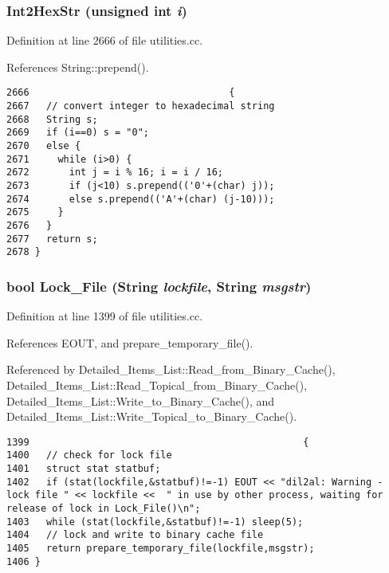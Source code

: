 \subsubsection{ Int2Hex\-Str (unsigned int {\em i})}\label{utilities_8cc_a80}




Definition at line 2666 of file utilities.cc.

References String::prepend().



\footnotesize\begin{verbatim}2666                                   {
2667   // convert integer to hexadecimal string
2668   String s;
2669   if (i==0) s = "0";
2670   else {
2671     while (i>0) {
2672       int j = i % 16; i = i / 16;
2673       if (j<10) s.prepend(('0'+(char) j));
2674       else s.prepend(('A'+(char) (j-10)));
2675     }
2676   }
2677   return s;
2678 }
\end{verbatim}\normalsize 
{}
\subsubsection{\setlength{\rightskip}{0pt plus 5cm}bool Lock\_\-File ({\bf String} {\em lockfile}, {\bf String} {\em msgstr})}\label{utilities_8cc_a12}




Definition at line 1399 of file utilities.cc.

References EOUT, and prepare\_\-temporary\_\-file().

Referenced by Detailed\_\-Items\_\-List::Read\_\-from\_\-Binary\_\-Cache(), Detailed\_\-Items\_\-List::Read\_\-Topical\_\-from\_\-Binary\_\-Cache(), Detailed\_\-Items\_\-List::Write\_\-to\_\-Binary\_\-Cache(), and Detailed\_\-Items\_\-List::Write\_\-Topical\_\-to\_\-Binary\_\-Cache().



\footnotesize\begin{verbatim}1399                                                {
1400   // check for lock file
1401   struct stat statbuf;
1402   if (stat(lockfile,&statbuf)!=-1) EOUT << "dil2al: Warning - lock file " << lockfile <<  " in use by other process, waiting for release of lock in Lock_File()\n";
1403   while (stat(lockfile,&statbuf)!=-1) sleep(5);
1404   // lock and write to binary cache file
1405   return prepare_temporary_file(lockfile,msgstr);
1406 }
\end{verbatim}\normalsize 
{}
